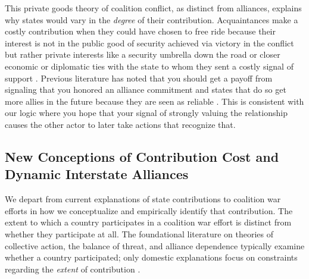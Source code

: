 \documentclass[12pt,letterpaper]{article}
\begin{document}
	This private goods theory of coalition conflict, as distinct from alliances, explains why states would vary in the \textit{degree} of their contribution. Acquaintances make a costly contribution when they could have chosen to free ride because their interest is not in the public good of security achieved via victory in the conflict but rather private interests like a security umbrella down the road or closer economic or diplomatic ties with the state to whom they sent a costly signal of support \citep{long_defensepactsinternational_2003}. Previous literature has noted that you should get a payoff from signaling that you honored an alliance commitment and states that do so get more allies in the future because they are seen as reliable \citep[427-428]{gibler_costsrenegingreputation_2008}. This is consistent with our logic where you hope that your signal of strongly valuing the relationship causes the other actor to later take actions that recognize that.
	
	\subsection{New Conceptions of Contribution Cost and Dynamic Interstate Alliances}
		We depart from current explanations of state contributions to coalition war efforts in how we conceptualize and empirically identify that contribution. The extent to which a country participates in a coalition war effort is distinct from whether they participate at all. The foundational literature on theories of collective action, the balance of threat, and alliance dependence typically examine whether a country participated; only domestic explanations focus on constraints regarding the \textit{extent} of contribution \citep{bennett_burdensharingpersiangulf_1994, bogers_missionafghanistanwho_2013}.
\end{document}
